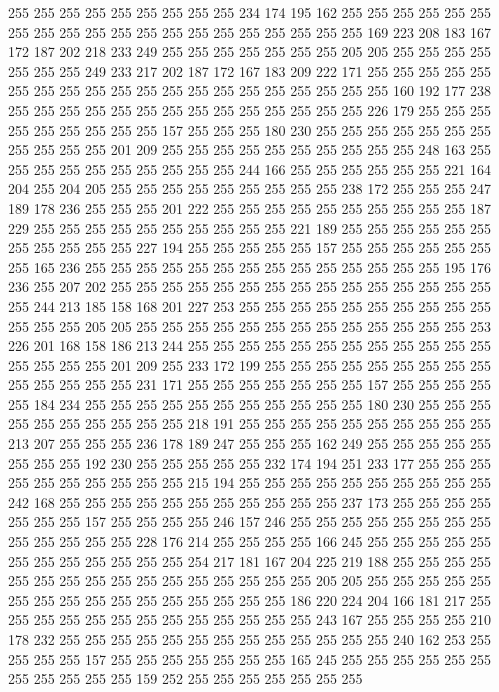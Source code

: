255 255 255 255 255 255 255 255 255 234 174 195 162 255 255 255 255 255 255 255
255 255 255 255 255 255 255 255 255 255 255 255 255 169 223 208 183 167 172 187
202 218 233 249 255 255 255 255 255 255 255 205 205 255 255 255 255 255 255 255
249 233 217 202 187 172 167 183 209 222 171 255 255 255 255 255 255 255 255 255
255 255 255 255 255 255 255 255 255 255 255 160 192 177 238 255 255 255 255 255
255 255 255 255 255 255 255 255 255 226 179 255 255 255 255 255 255 255 255 255
157 255 255 255 180 230 255 255 255 255 255 255 255 255 255 255 255 201 209 255
255 255 255 255 255 255 255 255 255 248 163 255 255 255 255 255 255 255 255 255
255 244 166 255 255 255 255 255 255 221 164 204 255 204 205 255 255 255 255 255
255 255 255 255 238 172 255 255 255 247 189 178 236 255 255 255 201 222 255 255
255 255 255 255 255 255 255 255 187 229 255 255 255 255 255 255 255 255 255 255
221 189 255 255 255 255 255 255 255 255 255 255 255 227 194 255 255 255 255 255
157 255 255 255 255 255 255 255 165 236 255 255 255 255 255 255 255 255 255 255
255 255 255 255 195 176 236 255 207 202 255 255 255 255 255 255 255 255 255 255
255 255 255 255 255 255 244 213 185 158 168 201 227 253 255 255 255 255 255 255
255 255 255 255 255 255 255 205 205 255 255 255 255 255 255 255 255 255 255 255
255 255 253 226 201 168 158 186 213 244 255 255 255 255 255 255 255 255 255 255
255 255 255 255 255 255 201 209 255 233 172 199 255 255 255 255 255 255 255 255
255 255 255 255 255 255 231 171 255 255 255 255 255 255 255 157 255 255 255 255
255 184 234 255 255 255 255 255 255 255 255 255 255 255 180 230 255 255 255 255
255 255 255 255 255 255 218 191 255 255 255 255 255 255 255 255 255 255 213 207
255 255 255 236 178 189 247 255 255 255 162 249 255 255 255 255 255 255 255 255
192 230 255 255 255 255 255 232 174 194 251 233 177 255 255 255 255 255 255 255
255 255 255 215 194 255 255 255 255 255 255 255 255 255 255 242 168 255 255 255
255 255 255 255 255 255 255 255 237 173 255 255 255 255 255 255 255 157 255 255
255 255 246 157 246 255 255 255 255 255 255 255 255 255 255 255 255 255 228 176
214 255 255 255 255 166 245 255 255 255 255 255 255 255 255 255 255 255 255 254
217 181 167 204 225 219 188 255 255 255 255 255 255 255 255 255 255 255 255 255
255 255 255 205 205 255 255 255 255 255 255 255 255 255 255 255 255 255 255 255
255 186 220 224 204 166 181 217 255 255 255 255 255 255 255 255 255 255 255 255
255 243 167 255 255 255 255 210 178 232 255 255 255 255 255 255 255 255 255 255
255 255 255 240 162 253 255 255 255 255 157 255 255 255 255 255 255 255 165 245
255 255 255 255 255 255 255 255 255 255 255 159 252 255 255 255 255 255 255 255
